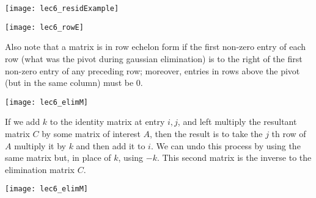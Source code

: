 \documentclass[../main.tex]{subfiles}
\begin{document}
\begin{center}
    \texttt{[image: lec6\_residExample]}
\end{center}

\begin{center}
    \texttt{[image: lec6\_rowE]}
\end{center}

\begin{remark}
    Also note that a matrix is in row echelon form if the first non-zero entry of each row (what was the pivot during gaussian elimination) is to the right of the first non-zero entry of any preceding row; moreover, entries in rows above the pivot (but in the same column) must be $0$.
\end{remark}

\begin{center}
    \texttt{[image: lec6\_elimM]}
\end{center}

\begin{remark}
    If we add $k$ to the identity matrix at entry $i,j$, and left multiply the resultant
    matrix $C$ by some matrix of interest $A$, then the result is to take the $j$ th row of $A$
    multiply it by $k$ and then add it to $i$. We can undo this process by using the same
    matrix but, in place of $k$, using $-k$. This second matrix is the inverse to the elimination matrix $C$.
\end{remark}

\begin{center}
    \texttt{[image: lec6\_elimM]}
\end{center}
\end{document}
